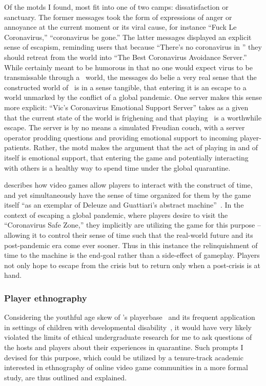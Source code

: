 \documentclass[russian,american]{../../../coursework}
\newcommand{\mc}{\citetitle{Minecraft}}
\begin{document}
Of the \ac{motd}s I found, most fit into one of two camps: dissatisfaction or sanctuary.
The former messages took the form of expressions of anger or annoyance at the current
moment or its viral cause, for instance \enquote{Fuck Le Coronavirus,}
\enquote{coronavirus be gone.} The latter messages displayed an explicit sense of
escapism, reminding users that because \enquote{There's no coronavirus in \mc} they
should retreat from the world into \enquote{The Best Coronavirus Avoidance Server.}
While certainly meant to be humorous in that no one would expect \ac{virus} to be
transmissable through a \mc\ world, the messages do belie a very real sense that
the constructed world of \mc\ is in a sense tangible, that entering it is an escape
to a world unmarked by the conflict of a global pandemic.
One server makes this sense more explicit: \enquote{Vic's Coronavirus Emotional
Support Server} takes as a given that the current state of the world is frighening
and that playing \mc\ is a worthwhile escape. The server is by no means a simulated
Freudian couch, with a server operator prodding questions and providing emotional
support to incoming player-patients. Rather, the \ac{motd} makes the argument that
the act of playing in and of itself is emotional support, that entering the game and
potentially interacting with others is a healthy way to spend time under the global
quarantine.

\textcite{Barker2019} describes how video games allow players to interact with the
construct of time, and yet simultaneously have the sense of time organized for them
by the game itself \enquote{as an exemplar of Deleuze and Guattiari's abstract
machine}~\parencite[90]{Barker2019}. In the context of escaping a global pandemic, where players
desire to visit the \enquote{Coronavirus Safe Zone,} they implicitly are utilizing
the game for this purpose -- allowing it to control their sense of time such that
the real-world future and its post-pandemic era come ever sooner.
Thus in this instance the relinquishment of time to the machine is the end-goal rather
than a side-effect of gameplay. Players not only hope to escape from the crisis
but to return only when a post-crisis is at hand.

\subsubsection{Player ethnography}

Considering the youthful age skew of \mc's playerbase~\parencite{Mavoa2018,Kopecky2014}
and its frequent application in
settings of children with developmental disability~\parencite{Ringland2016}, it
would have very likely violated the limits of ethical undergraduate research for me
to ask questions of the hosts and players about their experiences in quarantine.
Such prompts I devised for this purpose, which could be utilized by a
tenure-track academic interested in ethnography of online video game communities
in a more formal study, are thus outlined and explained.
\end{document}
